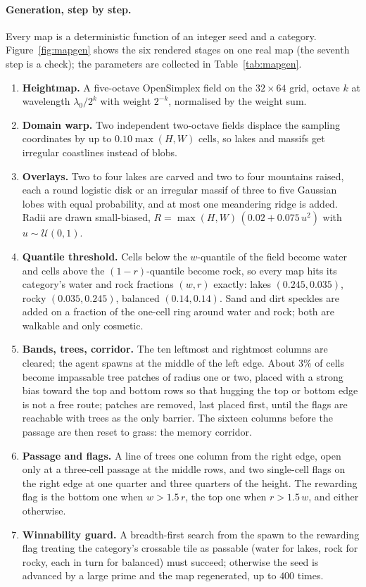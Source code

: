 \paragraph{Generation, step by step.}
Every map is a deterministic function of an integer seed and a category.
Figure~\ref{fig:mapgen} shows the six rendered stages on one real map (the
seventh step is a check); the parameters are collected in Table~\ref{tab:mapgen}.
\begin{enumerate}[leftmargin=1.4em, itemsep=1pt]
\item \textbf{Heightmap.} A five-octave OpenSimplex field
\citep{spencer2014opensimplex} on the $32\times64$ grid, octave $k$ at
wavelength $\lambda_0/2^k$ with weight $2^{-k}$, normalised by the weight sum.
\item \textbf{Domain warp.} Two independent two-octave fields displace the
sampling coordinates by up to $0.10\max(H,W)$ cells, so lakes and massifs get
irregular coastlines instead of blobs.
\item \textbf{Overlays.} Two to four lakes are carved and two to four
mountains raised, each a round logistic disk or an irregular massif of three to
five Gaussian lobes with equal probability, and at most one meandering ridge is
added. Radii are drawn small-biased, $R = \max(H,W)\,(0.02 + 0.075\,u^2)$ with
$u\sim\mathcal{U}(0,1)$.
\item \textbf{Quantile threshold.} Cells below the $w$-quantile of the field
become water and cells above the $(1-r)$-quantile become rock, so every map hits
its category's water and rock fractions $(w,r)$ exactly: lakes $(0.245,
0.035)$, rocky $(0.035, 0.245)$, balanced $(0.14, 0.14)$. Sand and dirt
speckles are added on a fraction of the one-cell ring around water and rock;
both are walkable and only cosmetic.
\item \textbf{Bands, trees, corridor.} The ten leftmost and rightmost columns
are cleared; the agent spawns at the middle of the left edge. About $3\%$ of
cells become impassable tree patches of radius one or two, placed with a strong
bias toward the top and bottom rows so that hugging the top or bottom edge is not a free route;
patches are removed, last placed first, until the flags are reachable with
trees as the only barrier. The sixteen columns before the passage are then reset
to grass: the memory corridor.
\item \textbf{Passage and flags.} A line of trees one column from the right
edge, open only at a three-cell passage at the middle rows, and two single-cell flags on the right
edge at one quarter and three quarters of the height. The rewarding flag is the
bottom one when $w > 1.5\,r$, the top one when $r > 1.5\,w$, and either
otherwise.
\item \textbf{Winnability guard.} A breadth-first search from the spawn to the
rewarding flag treating the category's crossable tile as passable (water for
lakes, rock for rocky, each in turn for balanced) must succeed; otherwise the
seed is advanced by a large prime and the map regenerated, up to $400$ times.
\end{enumerate}


